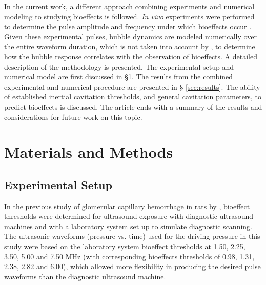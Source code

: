 \documentclass[%
preprint,%
author-year,%
]{jasatex}
\begin{document}
In the current work, a different approach combining experiments and
numerical modeling to studying bioeffects is followed.  \emph{In vivo}
experiments were performed to determine the pulse amplitude and
frequency under which bioeffects occur \cite[]{miller2008b}.  Given
these experimental pulses, bubble dynamics are modeled numerically
over the entire waveform duration, which is not taken into account by
\cite{apfel1991}, to determine how the bubble response correlates with
the observation of bioeffects.  A detailed description of the methodology is
presented. The experimental setup and numerical model are first
discussed in \S \ref{sec:methods}. The results from the combined
experimental and numerical procedure are presented in \S
\ref{sec:results}. The ability of established inertial cavitation
thresholds, and general cavitation parameters, to predict bioeffects
is discussed. The article ends with a summary of the results and
considerations for future work on this topic.




\section{Materials and Methods}
\label{sec:methods}
\subsection{Experimental Setup}

In the previous study of glomerular capillary hemorrhage in rats by
\cite{miller2008b}, bioeffect thresholds were determined for
ultrasound exposure with diagnostic ultrasound machines and with a
laboratory system set up to simulate diagnostic scanning.  The
ultrasonic waveforms (pressure vs. time) used for the driving pressure
in this study were based on the laboratory system bioeffect thresholds
at 1.50, 2.25, 3.50, 5.00 and 7.50 MHz (with corresponding bioeffects
thresholds of 0.98, 1.31, 2.38, 2.82 and 6.00), which allowed more flexibility
in producing the desired pulse waveforms than the diagnostic
ultrasound machine.  
\end{document}

